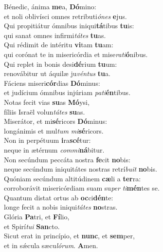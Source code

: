 \evenverse Bénedic, ánima \textbf{me}a, \textbf{Dó}mino:~\*\\
\evenverse et noli oblivísci omnes retributi\textit{ó}\textit{nes} \textbf{e}jus.\\
\oddverse Qui propitiátur ómnibus iniqui\textbf{tá}tibus \textbf{tu}is:~\*\\
\oddverse qui sanat omnes infirmi\textit{tá}\textit{tes} \textbf{tu}as.\\
\evenverse Qui rédimit de intéritu \textbf{vi}tam \textbf{tu}am:~\*\\
\evenverse qui corónat te in misericórdia et mise\textit{ra}\textit{ti}\textbf{ó}nibus.\\
\oddverse Qui replet in bonis desi\textbf{dé}rium \textbf{tu}um:~\*\\
\oddverse renovábitur ut áquilæ ju\textit{vén}\textit{tus} \textbf{tu}a.\\
\evenverse Fáciens miseri\textbf{cór}dias \textbf{Dó}minus:~\*\\
\evenverse et judícium ómnibus injúriam \textit{pa}\textit{ti}\textbf{én}tibus.\\
\oddverse Notas fecit vias \textbf{su}as \textbf{Mó}ysi,~\*\\
\oddverse fíliis Israël volun\textit{tá}\textit{tes} \textbf{su}as.\\
\evenverse Miserátor, et mi\textbf{sé}ricors \textbf{Dó}minus:~\*\\
\evenverse longánimis et mul\textit{tum} \textit{mi}\textbf{sé}ricors.\\
\oddverse Non in perpétuum \textbf{i}ra\textbf{scé}tur:~\*\\
\oddverse neque in ætérnum \textit{com}\textit{mi}\textbf{ná}bitur.\\
\evenverse Non secúndum peccáta nostra \textbf{fe}cit \textbf{no}bis:~\*\\
\evenverse neque secúndum iniquitátes nostras retrí\textit{bu}\textit{it} \textbf{no}bis.\\
\oddverse Quóniam secúndum altitúdinem \textbf{cæ}li a \textbf{ter}ra:~\*\\
\oddverse corroborávit misericórdiam suam su\textit{per} \textit{ti}\textbf{mén}tes se.\\
\evenverse Quantum distat ortus ab \textbf{oc}ci\textbf{dén}te:~\*\\
\evenverse longe fecit a nobis iniqui\textit{tá}\textit{tes} \textbf{no}stras.\\
\oddverse Glória \textbf{Pa}tri, et \textbf{Fí}lio,~\*\\
\oddverse et Spirí\textit{tu}\textit{i} \textbf{San}cto.\\
\evenverse Sicut erat in princípio, et \textbf{nunc}, et \textbf{sem}per,~\*\\
\evenverse et in sǽcula sæcu\textit{ló}\textit{rum}. \textbf{A}men.\\
